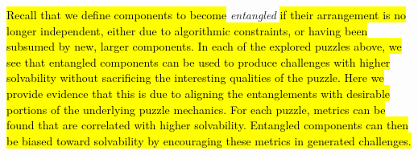 \documentclass[journal]{IEEEtran}
\begin{document}

\noindent
\hl{Recall that we define components to become} {\it entangled} \hl{if their arrangement is no longer independent, either due to algorithmic constraints, or having been subsumed by new, larger components. In each of the explored puzzles above, we see that entangled components can be used to produce challenges with higher solvability without sacrificing the interesting qualities of the puzzle. Here we provide evidence that this is due to aligning the entanglements with desirable portions of the underlying puzzle mechanics. For each puzzle, metrics can be found that are correlated with higher solvability. Entangled components can then be biased toward solvability by encouraging these metrics in generated challenges.}
\end{document}
